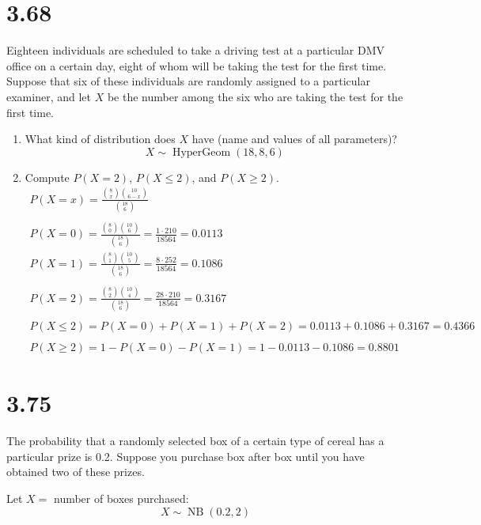 \documentclass[letterpaper,12pt,fleqn]{article}
\DeclareMathOperator{\hg}{HyperGeom}
\DeclareMathOperator{\nb}{NB}
\begin{document}
\section*{3.68}

Eighteen individuals are scheduled to take a driving test at a particular DMV office on a certain day, eight of whom will be
taking the test for the first time.  Suppose that six of these individuals are randomly assigned to a particular examiner,
and let \(X\) be the number among the six who are taking the test for the first time.

\begin{enumerate}[label={\alph*)}]
\item What kind of distribution does \(X\) have (name and values of all parameters)?
  \[X\sim\hg(18,8,6)\]
\item Compute \(P(X=2)\), \(P(X\le2)\), and \(P(X\ge2)\).
  \begin{gather*}
    P(X=x)=\frac{\binom{8}{x}\binom{10}{6-x}}{\binom{18}{6}} \\
    \\
    P(X=0)=\frac{\binom{8}{0}\binom{10}{6}}{\binom{18}{6}}=\frac{1\cdot210}{18564}=0.0113 \\
    P(X=1)=\frac{\binom{8}{1}\binom{10}{5}}{\binom{18}{6}}=\frac{8\cdot252}{18564}=0.1086 \\
    \\
    P(X=2)=\frac{\binom{8}{2}\binom{10}{4}}{\binom{18}{6}}=\frac{28\cdot210}{18564}=0.3167 \\
    \\
    P(X\le2)=P(X=0)+P(X=1)+P(X=2)=0.0113+0.1086+0.3167=0.4366 \\
    \\
    P(X\ge2)=1-P(X=0)-P(X=1)=1-0.0113-0.1086=0.8801
  \end{gather*}
\end{enumerate}

\section*{3.75}

The probability that a randomly selected box of a certain type of cereal has a particular prize is 0.2.  Suppose you purchase
box after box until you have obtained two of these prizes.

Let \(X=\) number of boxes purchased:
\[X\sim\nb(0.2,2)\]
\end{document}
